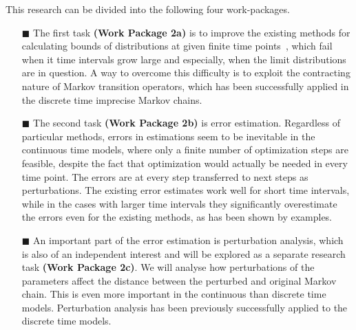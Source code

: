 \documentclass[11pt,dvipsnames,usenames,a4paper]{article}
\begin{document}
This research can be divided into the following four work-packages.

\vspace{6pt}
\begin{itemize}
\item[\tiny$\blacksquare$]  
The first task {\bf(Work Package 2a)} is to improve the existing methods for calculating bounds of distributions at given finite time points~\cite{skulj2015:continuous:bounds}, which fail when it time intervals grow large and especially, when the limit distributions are in question. A way to overcome this difficulty is to exploit the contracting nature of Markov transition operators, which has been successfully applied in the discrete time imprecise Markov chains. 

\item[\tiny$\blacksquare$] 
The second task {\bf(Work Package 2b)} is error estimation. 
Regardless of particular methods, errors in estimations seem to be inevitable in the continuous time models, where only a finite number of optimization steps are feasible, despite the fact that optimization would actually be needed in every time point. 
The errors are at every step transferred to next steps as perturbations. 
The existing error estimates work well for short time intervals, while in the cases with larger time intervals they significantly overestimate the errors even for the existing methods, as has been shown by examples. 

\item[\tiny$\blacksquare$] 
An important part of the error estimation is perturbation analysis, which is also of an independent interest and will be explored as a separate research task {\bf(Work Package 2c)}. 
We will analyse how perturbations of the parameters affect the distance between the perturbed and original Markov chain. 
This is even more important in the continuous than discrete time models.
Perturbation analysis has been previously successfully applied to the discrete time models. 


\end{itemize}
\end{document}
